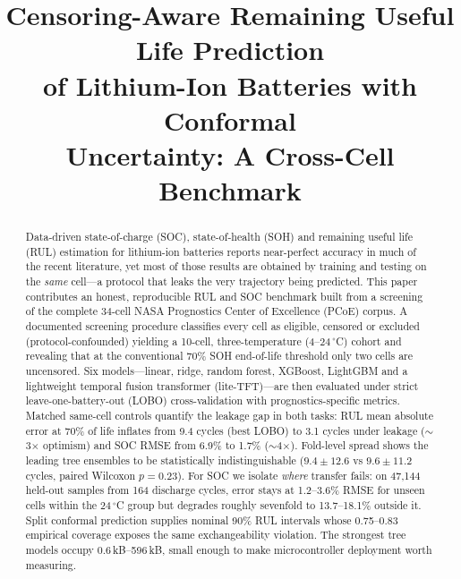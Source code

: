 \documentclass[conference,a4paper]{IEEEtran}
\begin{document}
\title{Censoring-Aware Remaining Useful Life Prediction\\
of Lithium-Ion Batteries with Conformal\\
Uncertainty: A Cross-Cell Benchmark}


\maketitle
\vspace{-6pt}

\begin{abstract}
Data-driven state-of-charge (SOC), state-of-health (SOH) and remaining
useful life (RUL) estimation for lithium-ion batteries reports near-perfect
accuracy in much of the recent literature, yet most of those results are
obtained by training and testing on the \emph{same} cell---a protocol that
leaks the very trajectory being predicted. This paper contributes an honest,
reproducible RUL and SOC benchmark built from a screening of the complete
34-cell NASA Prognostics Center of Excellence (PCoE) corpus. A documented screening
procedure classifies every cell as eligible, censored or excluded
(protocol-confounded) yielding a 10-cell, three-temperature
(4--24\,$^\circ$C) cohort and revealing that at the conventional 70\% SOH
end-of-life threshold only two cells are uncensored. Six models---linear,
ridge, random forest, XGBoost, LightGBM and a lightweight temporal fusion
transformer (lite-TFT)---are then evaluated under strict
leave-one-battery-out (LOBO) cross-validation with prognostics-specific
metrics. Matched same-cell controls quantify the leakage gap in both tasks:
RUL mean absolute error at 70\% of life inflates from 9.4 cycles (best LOBO)
to 3.1 cycles under leakage ($\sim$3$\times$ optimism) and SOC RMSE from
6.9\% to 1.7\% ($\sim$4$\times$). Fold-level spread shows the leading tree
ensembles to be statistically indistinguishable ($9.4\pm12.6$ vs
$9.6\pm11.2$ cycles, paired Wilcoxon $p=0.23$). For SOC we isolate
\emph{where} transfer fails: on 47{,}144 held-out samples from 164 discharge
cycles, error stays at 1.2--3.6\% RMSE for unseen cells within the
24\,$^\circ$C group but degrades roughly sevenfold to 13.7--18.1\% outside
it. Split conformal prediction supplies nominal 90\% RUL intervals whose
0.75--0.83 empirical coverage exposes the same exchangeability violation.
The strongest tree models occupy 0.6\,kB--596\,kB, small enough to make
microcontroller deployment worth measuring.
\end{abstract}
\end{document}
